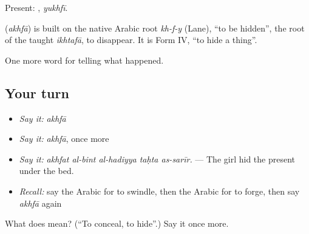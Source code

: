 Present: , \emph{yukhfī}.

\begin{cousinweb}
\textbf{} (\emph{akhfā}) is built on the native Arabic root \emph{kh-f-y} (Lane), \textquotedblleft{}to be hidden\textquotedblright{}, the root of the taught \emph{ikhtafā}, to disappear. It is Form IV, \textquotedblleft{}to hide a thing\textquotedblright{}.
\end{cousinweb}

\begin{grammarlens}[title={What you've built}]
One more word for telling what happened.
\end{grammarlens}

\subsection*{Your turn}
\begin{itemize}
\raggedright
  \item \emph{Say it:} \emph{akhfā}
  \item \emph{Say it:} \emph{akhfā}, once more
  \item \emph{Say it:} \emph{akhfat al-bint al-hadiyya taḥta as-sarīr.} — The girl hid the present under the bed.
  \item \emph{Recall:} say the Arabic for to swindle, then the Arabic for to forge, then say \emph{akhfā} again
\end{itemize}

\begin{tcolorbox}[breakable,colback=teal!4,colframe=teal!35!black,title={Before you move on}]
What does  mean? (\textquotedblleft{}To conceal, to hide\textquotedblright{}.) Say it once more.
\end{tcolorbox}
